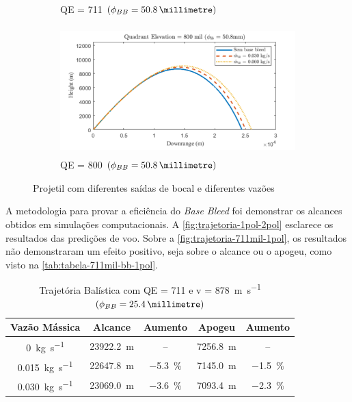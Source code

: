 \begin{figure}[!ht]
\begin{subfigure}[b]{0.47\textwidth}
        \caption{QE = \qty{711}{\milliradian} \(\left(\phi_{BB} = \qty{50,8}{\millimetre}\right)\)}
        \label{fig:trajetoria-711mil-2pol}
    \end{subfigure}
    \hfill
    \begin{subfigure}[b]{0.47\textwidth}
        \centering
        \includegraphics[height=5cm,width=\textwidth]{trajetoria_thallyo_wallace_basebleed-foto4.png}
        \caption{QE = \qty{800}{\milliradian} \(\left(\phi_{BB} = \qty{50,8}{\millimetre}\right)\)}
        \label{fig:trajetoria-800mil-2pol}
    \end{subfigure}
	\caption{Projetil com diferentes saídas de bocal e diferentes vazões}
	\label{fig:trajetoria-1pol-2pol}
\end{figure}

A metodologia para provar a eficiência do \textit{Base Bleed} foi demonstrar os alcances obtidos em simulações computacionais. A \autoref{fig:trajetoria-1pol-2pol} esclarece os resultados das predições de voo. Sobre a \autoref{fig:trajetoria-711mil-1pol}, os resultados não demonstraram um efeito positivo, seja sobre o alcance ou o apogeu, como visto na \autoref{tab:tabela-711mil-bb-1pol}. 

\begin{table}[ht]
\centering
\caption[Trajetória Balística com QE = \qty{711}{\milliradian} e v = \qty{878}{\metre\per\second} \(\left(\phi_{BB} = \qty{25,4}{\millimetre}\right)\)]{Trajetória Balística com QE = \qty{711}{\milliradian} e v = \qty{878}{\metre\per\second} \(\left(\phi_{BB} = \qty{25,4}{\millimetre}\right)\)}
\vspace{0.5cm}
\begin{tabular}{c|c|c|c|c}
Vazão Mássica & Alcance & Aumento & Apogeu & Aumento \\
\hline
\qty{0}{\kilogram\per\second} & \qty{23922,2}{\metre} & -- & \qty{7256,8}{\metre} & -- \\ 
\qty{0,015}{\kilogram\per\second} & \qty{22647,8}{\metre} & \qty{-5,3}{\percent} & \qty{7145,0}{\metre} & \qty{-1,5}{\percent} \\
\qty{0,030}{\kilogram\per\second} & \qty{23069,0}{\metre} & \qty{-3,6}{\percent} & \qty{7093,4}{\metre} & \qty{-2,3}{\percent}
\end{tabular}
\label{tab:tabela-711mil-bb-1pol}
\end{table}

